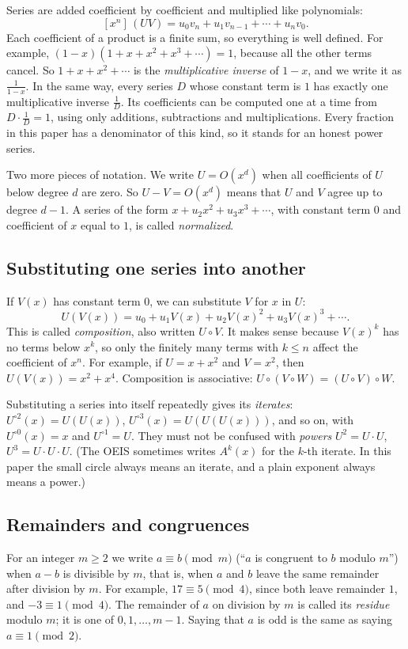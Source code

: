 \documentclass[11pt,a4paper]{article}
\theoremstyle{definition}
\theoremstyle{remark}
\newcommand{\coeff}[2]{[x^{#1}]\,#2}
\begin{document}
Series are added coefficient by coefficient and multiplied like polynomials:
\[
\coeff{n}{(UV)}=u_0v_n+u_1v_{n-1}+\cdots+u_nv_0 .
\]
Each coefficient of a product is a finite sum, so everything is well defined. For example,
$(1-x)(1+x+x^2+x^3+\cdots)=1$, because all the other terms cancel. So $1+x+x^2+\cdots$ is the
\emph{multiplicative inverse} of $1-x$, and we write it as $\frac{1}{1-x}$. In the same way, every series $D$ whose
constant term is $1$ has exactly one multiplicative inverse $\frac1D$. Its coefficients can be computed one at a time
from $D\cdot\frac1D=1$, using only additions, subtractions and multiplications. Every fraction in this paper has a
denominator of this kind, so it stands for an honest power series.

Two more pieces of notation. We write $U=O(x^d)$ when all coefficients of $U$ below degree $d$ are zero. So
$U-V=O(x^d)$ means that $U$ and $V$ agree up to degree $d-1$. A series of the form $x+u_2x^2+u_3x^3+\cdots$, with
constant term $0$ and coefficient of $x$ equal to $1$, is called \emph{normalized}.

\subsection{Substituting one series into another}
If $V(x)$ has constant term $0$, we can substitute $V$ for $x$ in $U$:
\[
U(V(x))=u_0+u_1V(x)+u_2V(x)^2+u_3V(x)^3+\cdots .
\]
This is called \emph{composition}, also written $U\circ V$. It makes sense because $V(x)^k$ has no terms below $x^k$,
so only the finitely many terms with $k\le n$ affect the coefficient of $x^n$. For example, if $U=x+x^2$ and $V=x^2$, then
$U(V(x))=x^2+x^4$. Composition is associative: $U\circ(V\circ W)=(U\circ V)\circ W$.

Substituting a series into itself repeatedly gives its \emph{iterates}: $U^{\circ2}(x)=U(U(x))$,
$U^{\circ3}(x)=U(U(U(x)))$, and so on, with $U^{\circ0}(x)=x$ and $U^{\circ1}=U$. They must not be confused with
\emph{powers} $U^2=U\cdot U$, $U^3=U\cdot U\cdot U$. (The OEIS sometimes writes $A^k(x)$ for the $k$-th iterate. In
this paper the small circle always means an iterate, and a plain exponent always means a power.)

\subsection{Remainders and congruences}
For an integer $m\ge2$ we write $a\equiv b\pmod m$ (``$a$ is congruent to $b$ modulo $m$'') when $a-b$ is divisible by
$m$, that is, when $a$ and $b$ leave the same remainder after division by $m$. For example, $17\equiv5\pmod 4$, since both leave remainder $1$, and $-3\equiv1\pmod4$. The
remainder of $a$ on division by $m$ is called its \emph{residue} modulo $m$; it is one of $0,1,\dots,m-1$. Saying that
$a$ is odd is the same as saying $a\equiv1\pmod2$.
\end{document}
